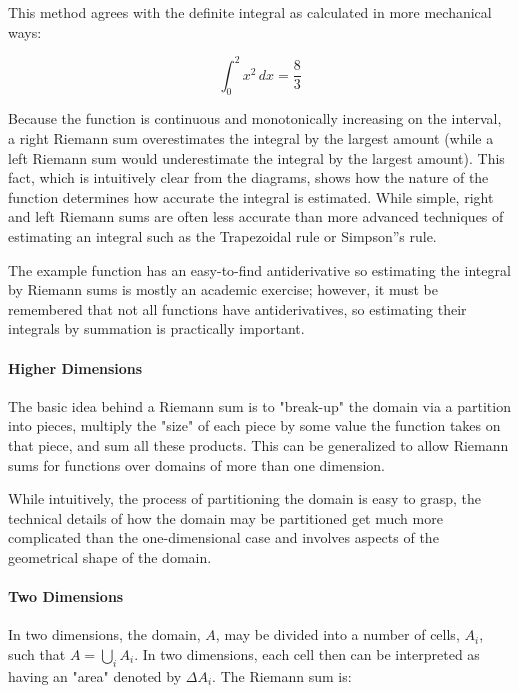 This method agrees with the definite integral as calculated in more mechanical ways:



$$\int_0^2 x^2 \, dx = \frac{8}{3}$$



Because the function is continuous and monotonically increasing on the interval, a right Riemann sum overestimates the integral by the largest amount (while a left Riemann sum would underestimate the integral by the largest amount). This fact, which is intuitively clear from the diagrams, shows how the nature of the function determines how accurate the integral is estimated. While simple, right and left Riemann sums are often less accurate than more advanced techniques of estimating an integral such as the Trapezoidal rule or Simpson''s rule.



The example function has an easy-to-find antiderivative so estimating the integral by Riemann sums is mostly an academic exercise; however, it must be remembered that not all functions have antiderivatives, so estimating their integrals by summation is practically important.



\paragraph{Higher Dimensions}



The basic idea behind a Riemann sum is to "break-up" the domain via a partition into pieces, multiply the "size" of each piece by some value the function takes on that piece, and sum all these products. This can be generalized to allow Riemann sums for functions over domains of more than one dimension.



While intuitively, the process of partitioning the domain is easy to grasp, the technical details of how the domain may be partitioned get much more complicated than the one-dimensional case and involves aspects of the geometrical shape of the domain.



\paragraph{Two Dimensions}



In two dimensions, the domain, $A$, may be divided into a number of cells, $A_i$, such that $A = \bigcup_i A_i$. In two dimensions, each cell then can be interpreted as having an "area" denoted by $\Delta A_i$. The Riemann sum is:



